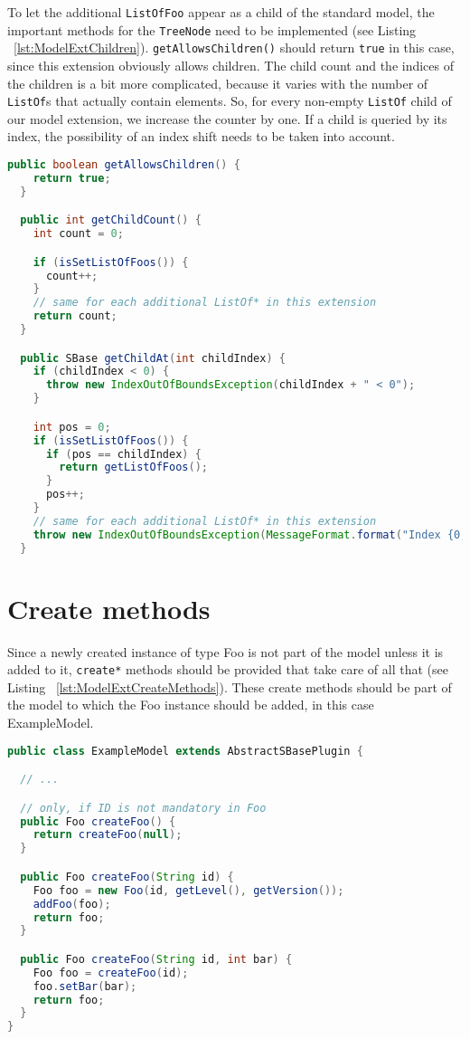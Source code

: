 To let the additional \texttt{ListOfFoo} appear as a child of the standard model, the important methods for the \texttt{TreeNode} need to be implemented (see Listing ~\vref{lst:ModelExtChildren}).
\texttt{getAllowsChildren()} should return \texttt{true} in this case, since this extension obviously allows children.
The child count and the indices of the children is a bit more complicated, because it varies with the number of \texttt{ListOf}s that actually contain elements.
So, for every non-empty \texttt{ListOf} child of our model extension, we increase the counter by one.
If a child is queried by its index, the possibility of an index shift needs to be taken into account.

\begin{lstlisting}[language=Java,caption={Methods which need to be implemented to make the children available in the extended model},label={lst:ModelExtChildren}]
  public boolean getAllowsChildren() {
    return true;
  }

  public int getChildCount() {
    int count = 0;

    if (isSetListOfFoos()) {
      count++;
    }
    // same for each additional ListOf* in this extension
    return count;
  }

  public SBase getChildAt(int childIndex) {
    if (childIndex < 0) {
      throw new IndexOutOfBoundsException(childIndex + " < 0");
    }

    int pos = 0;
    if (isSetListOfFoos()) {
      if (pos == childIndex) {
        return getListOfFoos();
      }
      pos++;
    }
    // same for each additional ListOf* in this extension
    throw new IndexOutOfBoundsException(MessageFormat.format("Index {0,number,integer} >= {1,number,integer}", childIndex, +((int) Math.min(pos, 0))));
  }
\end{lstlisting}



\section{Create methods}

Since a newly created instance of type Foo is not part of the model unless it is
added to it, \texttt{create*} methods should be provided that take care of all that (see Listing ~\ref{lst:ModelExtCreateMethods}).
These create methods should be part of the model to which the Foo instance should be added, in this case ExampleModel.

\begin{lstlisting}[language=Java,caption={Convenience method to create elements},label={lst:ModelExtCreateMethods}]
public class ExampleModel extends AbstractSBasePlugin {

  // ...

  // only, if ID is not mandatory in Foo
  public Foo createFoo() {
    return createFoo(null);
  }

  public Foo createFoo(String id) {
    Foo foo = new Foo(id, getLevel(), getVersion());
    addFoo(foo);
    return foo;
  }

  public Foo createFoo(String id, int bar) {
    Foo foo = createFoo(id);
    foo.setBar(bar);
    return foo;
  }
}
\end{lstlisting}


